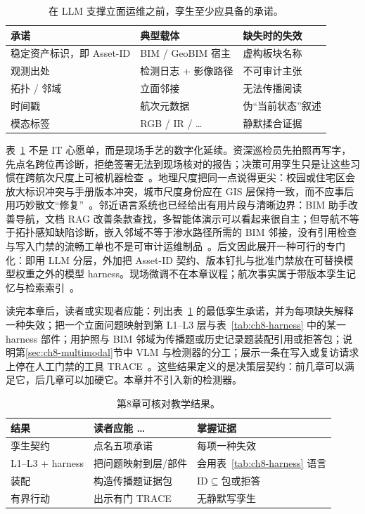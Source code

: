 \begin{table}[htbp]
\centering
\caption{在 LLM 支撑立面运维之前，孪生至少应具备的承诺。}
\label{tab:ch8-twin-contract}
\begin{tabular}{llp{5.4cm}}
\toprule
承诺 & 典型载体 & 缺失时的失效 \\
\midrule
稳定资产标识，即 Asset-ID & BIM / GeoBIM 宿主 & 虚构板块名称 \\
观测出处 & 检测日志 + 影像路径 & 不可审计主张 \\
拓扑 / 邻域 & 立面邻接 & 无法传播阅读 \\
时间戳 & 航次元数据 & 伪``当前状态''叙述 \\
模态标签 & RGB / IR / \ldots & 静默揉合证据 \\
\bottomrule
\end{tabular}
\end{table}

表~\ref{tab:ch8-twin-contract} 不是 IT 心愿单，而是现场手艺的数字化延续。资深巡检员先拍照再写字，先点名跨位再诊断，拒绝签署无法到现场核对的报告；决策可用孪生只是让这些习惯在跨航次尺度上可被机器检查~\cite{zhang2022,chen2023facility}。地理尺度把同一点说得更尖：校园或住宅区会放大标识冲突与手册版本冲突，城市尺度身份应在 GIS 层保持一致，而不应事后用巧妙散文``修复''~\cite{zhang2025,han2025}。邻近语言系统也已经给出有用片段与清晰边界：BIM 助手改善导航，文档 RAG 改善条款查找，多智能体演示可以看起来很自主；但导航不等于拓扑感知缺陷诊断，嵌入邻域不等于渗水路径所需的 BIM 邻接，没有引用检查与写入门禁的流畅工单也不是可审计运维制品~\cite{zheng2023bimassistant,lee2024ragsafety,peng2024,luo2025llmdtrobot,gao2026ifcagent}。后文因此展开一种可行的专门化：即用 LLM 分层，外加把 Asset-ID 契约、版本钉扎与批准门禁放在可替换模型权重之外的模型 harness。现场微调不在本章议程；航次事实属于带版本孪生记忆与检索索引~\cite{lewis2020,krutli2025fmrags,ma2026tenquestions}。

读完本章后，读者或实现者应能：列出表~\ref{tab:ch8-twin-contract} 的最低孪生承诺，并为每项缺失解释一种失效；把一个立面问题映射到第 L1--L3 层与表~\ref{tab:ch8-harness} 中的某一 harness 部件；用护照与 BIM 邻域为传播题或历史记录题装配引用或拒答包；说明第\ref{sec:ch8-multimodal}节中 VLM 与检测器的分工；展示一条在写入或复访请求上停在人工门禁的工具 TRACE~\cite{peng2024,yao2023react,liang2023helm,hellin2025bimmas}。这些结果定义的是决策层契约：前几章可以满足它，后几章可以加硬它。本章并不引入新的检测器。

\begin{table}[htbp]
\centering
\caption{第8章可核对教学结果。}
\label{tab:ch8-outcomes}
\begin{tabular}{llp{5.0cm}}
\toprule
结果 & 读者应能 \ldots & 掌握证据 \\
\midrule
孪生契约 & 点名五项承诺 & 每项一种失效 \\
L1--L3 + harness & 把问题映射到层/部件 & 会用表~\ref{tab:ch8-harness} 语言 \\
装配 & 构造传播题证据包 & ID$\subseteq$包或拒答 \\
有界行动 & 出示有门 TRACE & 无静默写孪生 \\
\bottomrule
\end{tabular}
\end{table}




